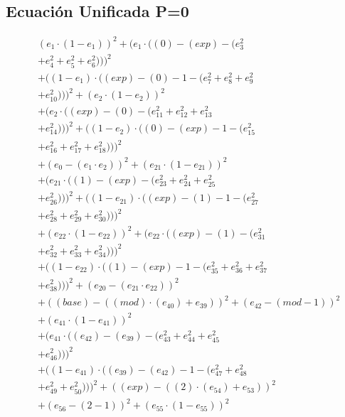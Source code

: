 \documentclass[10pt, a4paper]{article}
\begin{document}
\subsection*{Ecuación Unificada P=0}
\begin{align*}
& (e_{1}  \cdot  (1 - e_{1}))^{2} + (e_{1}  \cdot  ((0) - (exp) - (e_{3}^{2} \\
& + e_{4}^{2} + e_{5}^{2} + e_{6}^{2})))^{2} \\
& + ((1 - e_{1})  \cdot  ((exp) - (0) - 1 - (e_{7}^{2} + e_{8}^{2} + e_{9}^{2} \\
& + e_{10}^{2})))^{2} + (e_{2}  \cdot  (1 - e_{2}))^{2} \\
& + (e_{2}  \cdot  ((exp) - (0) - (e_{11}^{2} + e_{12}^{2} + e_{13}^{2} \\
& + e_{14}^{2})))^{2} + ((1 - e_{2})  \cdot  ((0) - (exp) - 1 - (e_{15}^{2} \\
& + e_{16}^{2} + e_{17}^{2} + e_{18}^{2})))^{2} \\
& + (e_{0} - (e_{1}  \cdot  e_{2}))^{2} + (e_{21}  \cdot  (1 - e_{21}))^{2} \\
& + (e_{21}  \cdot  ((1) - (exp) - (e_{23}^{2} + e_{24}^{2} + e_{25}^{2} \\
& + e_{26}^{2})))^{2} + ((1 - e_{21})  \cdot  ((exp) - (1) - 1 - (e_{27}^{2} \\
& + e_{28}^{2} + e_{29}^{2} + e_{30}^{2})))^{2} \\
& + (e_{22}  \cdot  (1 - e_{22}))^{2} + (e_{22}  \cdot  ((exp) - (1) - (e_{31}^{2} \\
& + e_{32}^{2} + e_{33}^{2} + e_{34}^{2})))^{2} \\
& + ((1 - e_{22})  \cdot  ((1) - (exp) - 1 - (e_{35}^{2} + e_{36}^{2} + e_{37}^{2} \\
& + e_{38}^{2})))^{2} + (e_{20} - (e_{21}  \cdot  e_{22}))^{2} \\
& + ((base) - ((mod)  \cdot  (e_{40}) + e_{39}))^{2} + (e_{42} - (mod - 1))^{2} \\
& + (e_{41}  \cdot  (1 - e_{41}))^{2} \\
& + (e_{41}  \cdot  ((e_{42}) - (e_{39}) - (e_{43}^{2} + e_{44}^{2} + e_{45}^{2} \\
& + e_{46}^{2})))^{2} \\
& + ((1 - e_{41})  \cdot  ((e_{39}) - (e_{42}) - 1 - (e_{47}^{2} + e_{48}^{2} \\
& + e_{49}^{2} + e_{50}^{2})))^{2} + ((exp) - ((2)  \cdot  (e_{54}) + e_{53}))^{2} \\
& + (e_{56} - (2 - 1))^{2} + (e_{55}  \cdot  (1 - e_{55}))^{2} \\

\end{align*}
\end{document}

